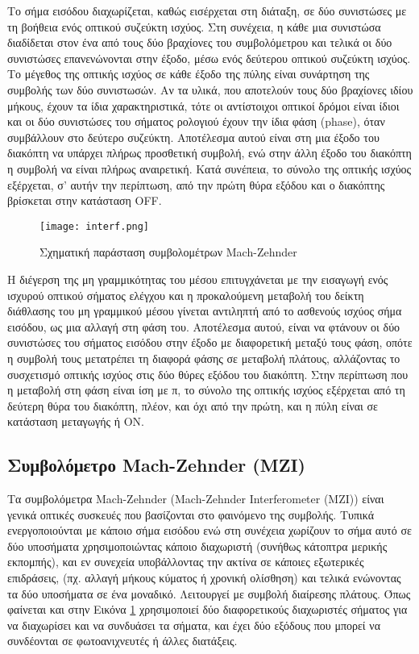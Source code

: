 Το σήμα εισόδου διαχωρίζεται, καθώς εισέρχεται στη διάταξη, σε δύο
συνιστώσες με τη βοήθεια ενός οπτικού συζεύκτη ισχύος. Στη συνέχεια, η
κάθε μια συνιστώσα διαδίδεται στον ένα από τους δύο βραχίονες του
συμβολόμετρου και τελικά οι δύο συνιστώσες επανενώνονται στην έξοδο,
μέσω ενός δεύτερου οπτικού συζεύκτη ισχύος. Το μέγεθος της οπτικής
ισχύος σε κάθε έξοδο της πύλης είναι συνάρτηση της συμβολής των δύο
συνιστωσών. Αν τα υλικά, που αποτελούν τους δύο βραχίονες ιδίου
μήκους, έχουν τα ίδια χαρακτηριστικά, τότε οι αντίστοιχοι οπτικοί
δρόμοι είναι ίδιοι και οι δύο συνιστώσες του σήματος ρολογιού έχουν
την ίδια φάση (phase), όταν συμβάλλουν στο δεύτερο
συζεύκτη. Αποτέλεσμα αυτού είναι στη μια έξοδο του διακόπτη να υπάρχει
πλήρως προσθετική συμβολή, ενώ στην άλλη έξοδο του διακόπτη η συμβολή
να είναι πλήρως αναιρετική. Κατά συνέπεια, το σύνολο της οπτικής
ισχύος εξέρχεται, σ’ αυτήν την περίπτωση, από την πρώτη θύρα εξόδου
και ο διακόπτης βρίσκεται στην κατάσταση OFF.

\begin{figure}[h]
  \centering
  \texttt{[image: interf.png]}
  \caption{Σχηματική παράσταση συμβολομέτρων Mach-Zehnder}
  \label{fig:mzi}
\end{figure}


Η διέγερση της μη γραμμικότητας του μέσου επιτυγχάνεται με την
εισαγωγή ενός ισχυρού οπτικού σήματος ελέγχου και η προκαλούμενη
μεταβολή του δείκτη διάθλασης του μη γραμμικού μέσου γίνεται αντιληπτή
από το ασθενούς ισχύος σήμα εισόδου, ως μια αλλαγή στη φάση
του. Αποτέλεσμα αυτού, είναι να φτάνουν οι δύο συνιστώσες του σήματος
εισόδου στην έξοδο με διαφορετική μεταξύ τους φάση, οπότε η συμβολή
τους μετατρέπει τη διαφορά φάσης σε μεταβολή πλάτους, αλλάζοντας το
συσχετισμό οπτικής ισχύος στις δύο θύρες εξόδου του διακόπτη. Στην
περίπτωση που η μεταβολή στη φάση είναι ίση με π, το σύνολο της
οπτικής ισχύος εξέρχεται από τη δεύτερη θύρα του διακόπτη, πλέον, και
όχι από την πρώτη, και η πύλη είναι σε κατάσταση μεταγωγής ή ON.

\subsection{Συμβολόμετρο Mach-Zehnder (MZI)}


Tα συμβολόμετρα Mach-Zehnder (Mach-Zehnder Interferometer (ΜΖΙ)) είναι
γενικά οπτικές συσκευές που βασίζονται στο φαινόμενο της
συμβολής. Τυπικά ενεργοποιούνται με κάποιο σήμα εισόδου ενώ στη
συνέχεια χωρίζουν το σήμα αυτό σε δύο υποσήματα χρησιμοποιώντας κάποιο
διαχωριστή (συνήθως κάτοπτρα μερικής εκπομπής), και εν συνεχεία
υποβάλλοντας την ακτίνα σε κάποιες εξωτερικές επιδράσεις, (πχ. αλλαγή
μήκους κύματος ή χρονική ολίσθηση) και τελικά ενώνοντας τα δύο
υποσήματα σε ένα μοναδικό. Λειτουργεί με συμβολή διαίρεσης πλάτους.
Όπως φαίνεται και στην Εικόνα \ref{fig:mzi}  χρησιμοποιεί δύο διαφορετικούς
διαχωριστές σήματος για να διαχωρίσει και να συνδυάσει τα σήματα, και
έχει δύο εξόδους που μπορεί να συνδέονται σε φωτοανιχνευτές ή άλλες
διατάξεις.


